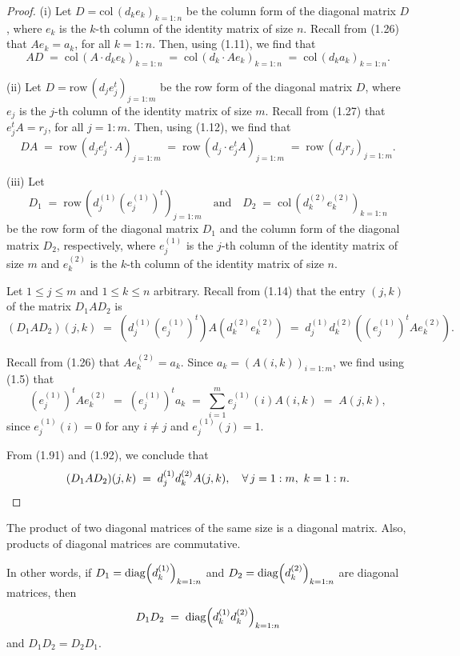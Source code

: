 \begin{proof}
(i) Let $D=\mathrm{col}\,(d_ke_k)_{k=1:n}$ be the column form of the
diagonal matrix $D$, where $e_k$ is the $k$-th column of the identity
matrix of size $n$. Recall from (1.26) that $Ae_k=a_k$, for all $k=1:n$.
Then, using (1.11), we find that
\[
AD \;=\; \mathrm{col}\,(A\cdot d_ke_k)_{k=1:n} \;=\; \mathrm{col}\,(d_k\cdot Ae_k)_{k=1:n}
\;=\; \mathrm{col}\,(d_ka_k)_{k=1:n}.
\]

(ii) Let $D=\mathrm{row}\,(d_je_j^t)_{j=1:m}$ be the row form of the
diagonal matrix $D$, where $e_j$ is the $j$-th column of the identity
matrix of size $m$. Recall from (1.27) that $e_j^tA=r_j$, for all $j=1:m$.
Then, using (1.12), we find that
\[
DA \;=\; \mathrm{row}\,(d_je_j^t\cdot A)_{j=1:m} \;=\; \mathrm{row}\,(d_j\cdot e_j^tA)_{j=1:m}
\;=\; \mathrm{row}\,(d_jr_j)_{j=1:m}.
\]

(iii) Let
\[
D_1 \;=\; \mathrm{row}\,\!\left(d_j^{(1)}(e_j^{(1)})^t\right)_{j=1:m}
\quad\text{and}\quad
D_2 \;=\; \mathrm{col}\,\!\left(d_k^{(2)}e_k^{(2)}\right)_{k=1:n}
\]
be the row form of the diagonal matrix $D_1$ and the column form of the
diagonal matrix $D_2$, respectively, where $e_j^{(1)}$ is the $j$-th
column of the identity matrix of size $m$ and $e_k^{(2)}$ is the $k$-th
column of the identity matrix of size $n$.

Let $1\le j\le m$ and $1\le k\le n$ arbitrary. Recall from (1.14) that the
entry $(j,k)$ of the matrix $D_1AD_2$ is
\begin{equation}
(D_1AD_2)(j,k) \;=\; \left(d_j^{(1)}(e_j^{(1)})^t\right)A\left(d_k^{(2)}e_k^{(2)}\right)
\;=\; d_j^{(1)}d_k^{(2)}\left((e_j^{(1)})^tAe_k^{(2)}\right).
\end{equation}

Recall from (1.26) that $Ae_k^{(2)}=a_k$. Since $a_k=(A(i,k))_{i=1:m}$, we
find using (1.5) that
\begin{equation}
(e_j^{(1)})^tAe_k^{(2)} \;=\; (e_j^{(1)})^ta_k \;=\; \sum_{i=1}^m e_j^{(1)}(i)A(i,k) \;=\; A(j,k),
\end{equation}
since $e_j^{(1)}(i)=0$ for any $i\ne j$ and $e_j^{(1)}(j)=1$.

From (1.91) and (1.92), we conclude that
\[
(D_1AD_2)(j,k) \;=\; d_j^{(1)}d_k^{(2)}A(j,k), \quad \forall\, j=1:m,\ k=1:n. \qedhere
\]
\end{proof}

\begin{lemma}
The product of two diagonal matrices of the same size is a diagonal
matrix. Also, products of diagonal matrices are commutative.

In other words, if $D_1=\operatorname{diag}\!\left(d_k^{(1)}\right)_{k=1:n}$ and
$D_2=\operatorname{diag}\!\left(d_k^{(2)}\right)_{k=1:n}$ are diagonal matrices, then
\begin{equation}
D_1D_2 \;=\; \operatorname{diag}\!\left(d_k^{(1)}d_k^{(2)}\right)_{k=1:n}
\end{equation}
and $D_1D_2=D_2D_1$.
\end{lemma}

